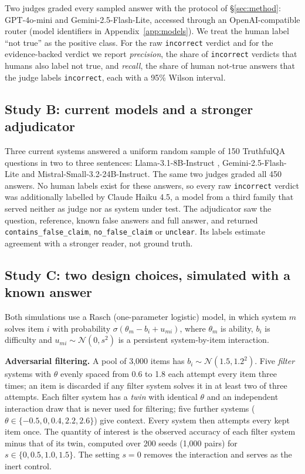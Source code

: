 Two judges graded every sampled answer with the protocol of \S\ref{sec:method}: GPT-4o-mini and Gemini-2.5-Flash-Lite, accessed through an OpenAI-compatible router (model identifiers in Appendix~\ref{app:models}). We treat the human label ``not true'' as the positive class. For the raw \texttt{incorrect} verdict and for the evidence-backed verdict we report \emph{precision}, the share of \texttt{incorrect} verdicts that humans also label not true, and \emph{recall}, the share of human not-true answers that the judge labels \texttt{incorrect}, each with a 95\% Wilson interval.

\subsection{Study B: current models and a stronger adjudicator}
\label{sec:setup-current}

Three current systems answered a uniform random sample of 150 TruthfulQA questions in two to three sentences: Llama-3.1-8B-Instruct \citep{grattafiori2024llama3}, Gemini-2.5-Flash-Lite and Mistral-Small-3.2-24B-Instruct. The same two judges graded all 450 answers. No human labels exist for these answers, so every raw \texttt{incorrect} verdict was additionally labelled by Claude Haiku 4.5, a model from a third family that served neither as judge nor as system under test. The adjudicator saw the question, reference, known false answers and full answer, and returned \texttt{contains\_false\_claim}, \texttt{no\_false\_claim} or \texttt{unclear}. Its labels estimate agreement with a stronger reader, not ground truth.

\subsection{Study C: two design choices, simulated with a known answer}
\label{sec:setup-sim}

Both simulations use a Rasch (one-parameter logistic) model, in which system $m$ solves item $i$ with probability $\sigma(\theta_m - b_i + u_{mi})$, where $\theta_m$ is ability, $b_i$ is difficulty and $u_{mi} \sim \mathcal{N}(0, s^2)$ is a persistent system-by-item interaction.

\textbf{Adversarial filtering.} A pool of 3{,}000 items has $b_i \sim \mathcal{N}(1.5, 1.2^2)$. Five \emph{filter} systems with $\theta$ evenly spaced from 0.6 to 1.8 each attempt every item three times; an item is discarded if any filter system solves it in at least two of three attempts. Each filter system has a \emph{twin} with identical $\theta$ and an independent interaction draw that is never used for filtering; five further systems ($\theta \in \{-0.5, 0, 0.4, 2.2, 2.6\}$) give context. Every system then attempts every kept item once. The quantity of interest is the observed accuracy of each filter system minus that of its twin, computed over 200 seeds (1{,}000 pairs) for $s \in \{0, 0.5, 1.0, 1.5\}$. The setting $s = 0$ removes the interaction and serves as the inert control.

